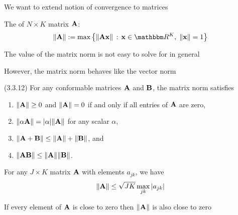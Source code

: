 \begin{frame}

    \vspace{2em}
    We want to extend notion of convergence to matrices
    
    \vspace{.7em}
    The  of $N \times K$ matrix $\mathbf A$:
    \begin{equation}
    \label{eq:mn}
    \| \boldA \| :=
    \max \left\{ 
        \| \boldA \boldx \| \,: \, 
        \boldx \in \RR^K, \; \| \boldx \| = 1
        \right\}
    \end{equation}

    \vspace{.7em}
    The value of the matrix norm is not easy to solve for in
    general
    
    However, the matrix
    norm behaves like the vector norm
    
\end{frame}

\begin{frame}

    \vspace{2em}
    \Fact (3.3.12)
    For any conformable matrices $\mathbf A$ and $\mathbf B$, the matrix norm 
    satisfies
    \begin{enumerate}
        \item $\| \mathbf A \| \geq 0$ and $\| \mathbf A \| = 0$ if and only if all entries of
            $\mathbf A$ are zero,
        \item $\| \alpha \mathbf A \| = |\alpha| \| \mathbf A \|$ for any scalar
            $\alpha$,
        \item $\| \mathbf A + \mathbf B \| \leq \| \mathbf A \| + \| \mathbf B \|$, and
        \item $\| \mathbf A \mathbf B \| \leq \| \mathbf A \| \| \mathbf B \|$.
    \end{enumerate}
    
    
\end{frame}

\begin{frame}

    \vspace{2em}
    \Fact{\eqref{ET-fa:mnbd}}
    For any $J \times K$ matrix $\mathbf A$ with elements $a_{jk}$, we have
    \begin{equation*}
        \| \mathbf A \| \leq \sqrt{JK} \max_{jk} |a_{jk}|
    \end{equation*}
    
    \vspace{1em}
    If every element of
    $\mathbf A$ is close to zero then $\| \mathbf A \|$ is also close to zero

\end{frame}

